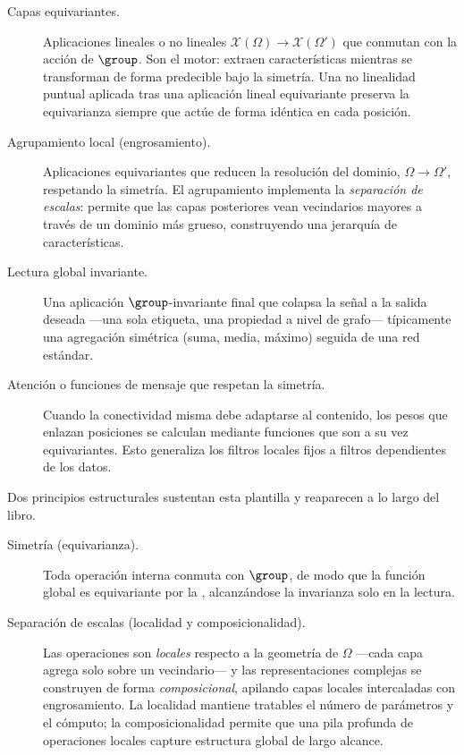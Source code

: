 \begin{description}
\item[Capas equivariantes.] Aplicaciones lineales o no lineales
$\mathcal{X}(\Omega) \to \mathcal{X}(\Omega')$ que conmutan con la acci\'on de
$\group$. Son el motor: extraen caracter\'isticas mientras se transforman de
forma predecible bajo la simetr\'ia. Una no linealidad puntual aplicada tras una
aplicaci\'on lineal equivariante preserva la equivarianza siempre que act\'ue de
forma id\'entica en cada posici\'on.
\item[Agrupamiento local (engrosamiento).] Aplicaciones equivariantes que reducen
la resoluci\'on del dominio, $\Omega \to \Omega'$, respetando la simetr\'ia. El
agrupamiento implementa la \emph{separaci\'on de escalas}: permite que las capas
posteriores vean vecindarios mayores a trav\'es de un dominio m\'as grueso,
construyendo una jerarqu\'ia de caracter\'isticas.
\item[Lectura global invariante.] Una aplicaci\'on $\group$-invariante final que
colapsa la se\~nal a la salida deseada ---una sola etiqueta, una propiedad a
nivel de grafo--- t\'ipicamente una agregaci\'on sim\'etrica (suma, media,
m\'aximo) seguida de una red est\'andar.
\item[Atenci\'on o funciones de mensaje que respetan la simetr\'ia.] Cuando la
conectividad misma debe adaptarse al contenido, los pesos que enlazan posiciones
se calculan mediante funciones que son a su vez equivariantes. Esto generaliza
los filtros locales fijos a filtros dependientes de los datos.
\end{description}

Dos principios estructurales sustentan esta plantilla y reaparecen a lo largo del
libro.

\begin{description}
\item[Simetr\'ia (equivarianza).] Toda operaci\'on interna conmuta con $\group$,
de modo que la funci\'on global es equivariante por la
, alcanz\'andose la invarianza solo en la lectura.
\item[Separaci\'on de escalas (localidad y composicionalidad).] Las operaciones
son \emph{locales} respecto a la geometr\'ia de $\Omega$ ---cada capa agrega solo
sobre un vecindario--- y las representaciones complejas se construyen de forma
\emph{composicional}, apilando capas locales intercaladas con engrosamiento. La
localidad mantiene tratables el n\'umero de par\'ametros y el c\'omputo; la
composicionalidad permite que una pila profunda de operaciones locales capture
estructura global de largo alcance.
\end{description}

